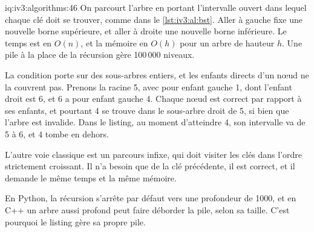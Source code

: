 \begin{solution}{iq:iv3:algorithms:46}
On parcourt l'arbre en portant l'intervalle ouvert dans lequel chaque clé doit se trouver, comme dans le \cref{lst:iv3:al:bst}. Aller à gauche fixe une nouvelle borne supérieure, et aller à droite une nouvelle borne inférieure. Le temps est en $O(n)$, et la mémoire en $O(h)$ pour un arbre de hauteur $h$. Une pile à la place de la récursion gère 100\,000 niveaux.
\label{lst:iv3:al:bst}

La condition porte sur des sous-arbres entiers, et les enfants directs d'un nœud ne la couvrent pas. Prenons la racine 5, avec pour enfant gauche 1, dont l'enfant droit est 6, et 6 a pour enfant gauche 4. Chaque nœud est correct par rapport à ses enfants, et pourtant 4 se trouve dans le sous-arbre droit de 5, si bien que l'arbre est invalide. Dans le listing, au moment d'atteindre 4, son intervalle va de 5 à 6, et 4 tombe en dehors.

L'autre voie classique est un parcours infixe, qui doit visiter les clés dans l'ordre strictement croissant. Il n'a besoin que de la clé précédente, il est correct, et il demande le même temps et la même mémoire.

En Python, la récursion s'arrête par défaut vers une profondeur de 1000, et en C++ un arbre aussi profond peut faire déborder la pile, selon sa taille. C'est pourquoi le listing gère sa propre pile.

\end{solution}

